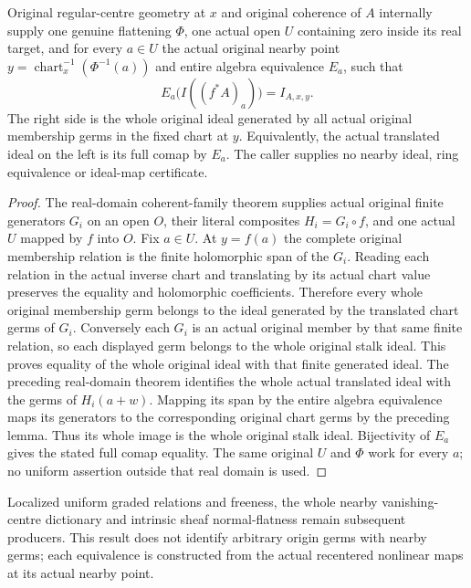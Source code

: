 \begin{theorem}
\label{hir:nonlinear-nearby-original-whole-stalk-dictionary}
\leanok
Original regular-centre geometry at $x$ and original coherence of $A$
internally supply one genuine flattening $\Phi$, one actual open $U$
containing zero inside its real target, and for every $a\in U$ the
actual original nearby point $y=\operatorname{chart}_x^{-1}(\Phi^{-1}(a))$
and entire algebra equivalence $E_a$, such that
\[
 E_a\bigl(I((f^*A)_a)\bigr)=I_{A,x,y}.
\]
The right side is the whole original ideal generated by all actual
original membership germs in the fixed chart at $y$. Equivalently,
the actual translated ideal on the left is its full comap by $E_a$.
The caller supplies no nearby ideal, ring equivalence or ideal-map
certificate.
\end{theorem}
\begin{proof}
The real-domain coherent-family theorem supplies actual original
finite generators $G_i$ on an open $O$, their literal composites
$H_i=G_i\circ f$, and one actual $U$ mapped by $f$ into $O$.
Fix $a\in U$. At $y=f(a)$ the complete original membership relation
is the finite holomorphic span of the $G_i$. Reading each relation in
the actual inverse chart and translating by its actual chart value
preserves the equality and holomorphic coefficients. Therefore every
whole original membership germ belongs to the ideal generated by the
translated chart germs of $G_i$. Conversely each $G_i$ is an actual
original member by that same finite relation, so each displayed germ
belongs to the whole original stalk ideal. This proves equality of
the whole original ideal with that finite generated ideal.
The preceding real-domain theorem identifies the whole actual
translated ideal with the germs of $H_i(a+w)$. Mapping its span by the
entire algebra equivalence maps its generators to the corresponding
original chart germs by the preceding lemma. Thus its whole image is
the whole original stalk ideal. Bijectivity of $E_a$ gives the stated
full comap equality. The same original $U$ and $\Phi$ work for every
$a$; no uniform assertion outside that real domain is used.
\end{proof}

Localized uniform graded relations and freeness, the whole nearby
vanishing-centre dictionary and intrinsic sheaf normal-flatness remain
subsequent producers. This result does not identify arbitrary origin
germs with nearby germs; each equivalence is constructed from the
actual recentered nonlinear maps at its actual nearby point.
